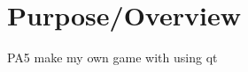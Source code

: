 \hypertarget{index_purpose}{}\section{\-Purpose/\-Overview}\label{index_purpose}
\-P\-A5 make my own game with using qt 
